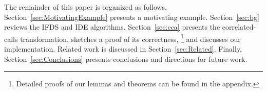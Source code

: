 The remainder of this paper is organized as follows.
%
Section~\ref{sec:MotivatingExample} presents a motivating example.
%
Section~\ref{sec:bg} reviews the IFDS and IDE algorithms.
%
Section~\ref{sec:cca} presents the correlated-calls transformation,
sketches a proof of its correctness,%
\footnote{
  Detailed proofs of our lemmas and theorems can be found in
  the appendix.
} and discusses our implementation.
%
%
Related work is discussed in Section~\ref{sec:Related}.
%
Finally, Section~\ref{sec:Conclusions} presents conclusions and directions for future work.

 
 
